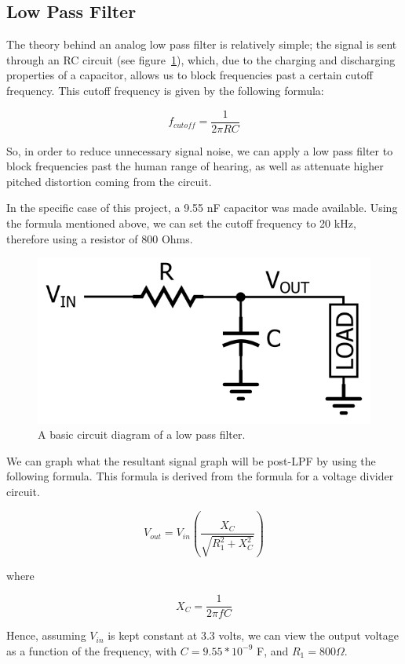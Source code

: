 \subsection{Low Pass Filter}\label{subsec:low-pass-filter}

The theory behind an analog low pass filter is relatively simple;
the signal is sent through an RC circuit (see figure~\ref{fig:LPF}), which, due to the charging and discharging properties of a capacitor, allows us to block frequencies past a certain cutoff frequency.
This cutoff frequency is given by the following formula:

\[
f_{cutoff}=\frac{1}{2 \pi R C}
\]

So, in order to reduce unnecessary signal noise, we can apply a low pass filter to block frequencies past the human range of hearing, as well as attenuate higher pitched distortion coming from the circuit. 

In the specific case of this project, a 9.55 nF capacitor was made available.
Using the formula mentioned above, we can set the cutoff frequency to 20 kHz, therefore using a resistor of 800 Ohms. 

\begin{figure}[H]
    \centering
    \includegraphics[width = 0.4 \textwidth]{lowpassfilter}
    \caption{A basic circuit diagram of a low pass filter. } %
    \label{fig:LPF}
\end{figure}

We can graph what the resultant signal graph will be post-LPF by using the following formula.
This formula is derived from the formula for a voltage divider circuit.



\[
V_{out}=V_{in}\left(\frac{X_{C}}{\sqrt{R_{1}^{2}+X_{C}^{2}}}\right)
\]

where

\[
X_{C}=\frac{1}{2 \pi f C}
\]

Hence, assuming $V_{in}$ is kept constant at 3.3 volts, we can view the output voltage as a function of the frequency, with $C = 9.55*10^{-9}$ F, and $R_1 = 800 \Omega$. 

